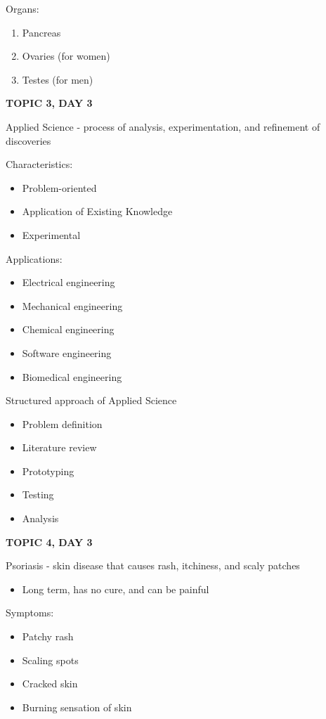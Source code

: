 {{Organs: 
\begin{enumerate}
    \item Pancreas
    \item Ovaries (for women)
    \item Testes (for men)
\end{enumerate}

\textbf{TOPIC 3, DAY 3}


Applied Science - process of analysis, experimentation, and refinement of discoveries


Characteristics:
\begin{itemize}
    \item Problem-oriented
    \item Application of Existing Knowledge
    \item Experimental
\end{itemize}


Applications:
\begin{itemize}
    \item Electrical engineering
    \item Mechanical engineering
    \item Chemical engineering
    \item Software engineering
    \item Biomedical engineering
\end{itemize}


Structured approach of Applied Science
\begin{itemize}
    \item Problem definition
    \item Literature review
    \item Prototyping
    \item Testing
    \item Analysis
\end{itemize}

\textbf{TOPIC 4, DAY 3}


Psoriasis - skin disease that causes rash, itchiness, and scaly patches
\begin{itemize}
    \item Long term, has no cure, and can be painful
\end{itemize}


Symptoms: 
\begin{itemize}
    \item Patchy rash
    \item Scaling spots
    \item Cracked skin
    \item Burning sensation of skin
\end{itemize}


}}
